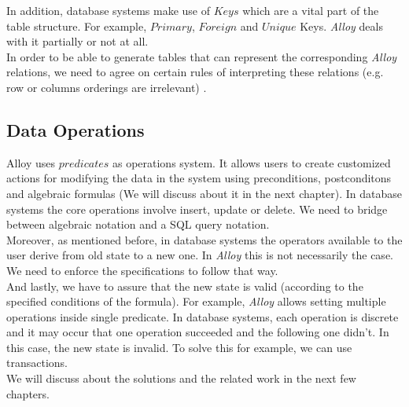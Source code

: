 \documentclass[oneside]{book}
\begin{document}
In addition, database systems make use of $Keys$ which are a vital part of the table structure. For example, $Primary$, $Foreign$ and $Unique$ Keys. \textit{Alloy} deals with it partially or not at all.\\ 

In order to be able to generate tables that can represent the corresponding \textit{Alloy} relations, we need to agree on certain rules of interpreting these relations (e.g. row or columns orderings are irrelevant) \cite[p.~151]{introtodb}.

\subsection{Data Operations}

Alloy uses $predicates$ as operations system. It allows users to create customized actions for modifying the data in the system using preconditions, postconditons and algebraic formulas (We will discuss about it in the next chapter). In database systems the core operations involve insert, update or delete. We need to bridge between algebraic notation and a SQL query notation.\\

Moreover, as mentioned before, in database systems the operators available to the user derive from old state to a new one. In \textit{Alloy} this is not necessarily the case. We need to enforce the specifications to follow that way.\\

And lastly, we have to assure that the new state is valid (according to the specified conditions of the formula). For example, \textit{Alloy} allows setting multiple operations inside single predicate. In database systems, each operation is discrete and it may occur that one operation succeeded and the following one didn't. In this case, the new state is invalid. To solve this for example, we can use transactions.\\

We will discuss about the solutions and the related work in the next few chapters.
\end{document}

